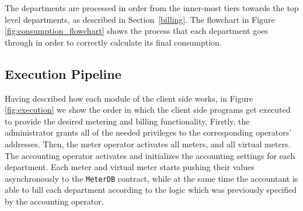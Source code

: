 The departments are processed in order from the inner-most tiers towards the top level departments, as described in Section~\ref{billing}. The flowchart in Figure \ref{fig:consumption_flowchart} shows the process that each department goes through in order to correctly calculate its final consumption.



\subsection{Execution Pipeline} \label{execution}

Having described how each module of the client side works, in Figure \ref{fig:execution} we show the order in which the client side programs get executed to provide the desired metering and billing functionality. Firstly, the administrator grants all of the needed privileges to the corresponding operators' addresses. Then, the meter operator activates all meters, and all virtual meters. The accounting operator activates and initializes the accounting settings for each department. Each meter and virtual meter starts pushing their values asynchronously to the \texttt{MeterDB} contract, while at the same time the accountant is able to bill each department according to the logic which was previously specified by the accounting operator.


